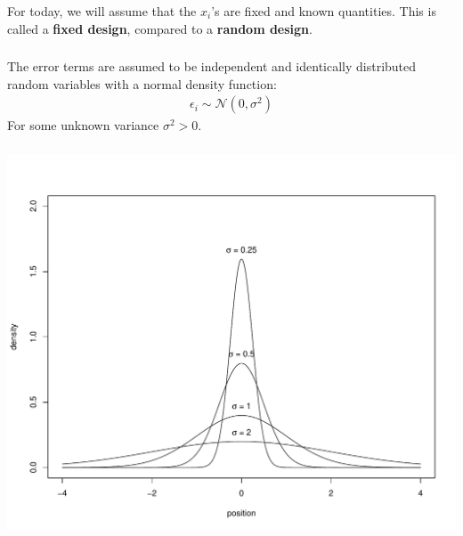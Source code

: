\begin{frame}[fragile] \frametitle{}

For today, we will assume that the $x_i$'s are fixed and
known quantities. This is called a {\bf fixed design}, compared
to a {\bf random design}.

\end{frame}

\begin{frame}[fragile] \frametitle{}

The error terms are assumed to be independent and identically
distributed random variables with a normal density function:
\begin{align*}
\epsilon_i \sim \mathcal{N}(0, \sigma^2)
\end{align*}
For some unknown variance $\sigma^2 > 0$.

\end{frame}

\begin{frame}[fragile] \frametitle{}

\begin{center}
\includegraphics[width=\linewidth]{img/normal_density.pdf}
\end{center}

\end{frame}

